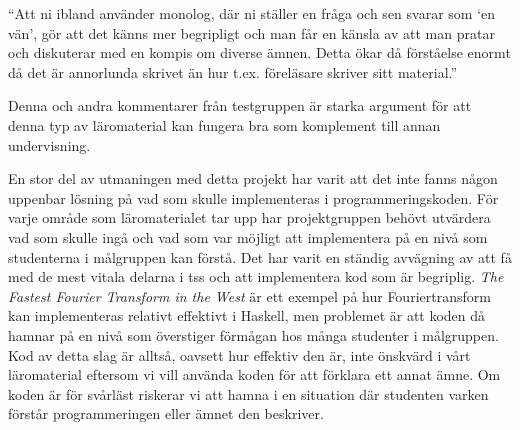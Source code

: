 \documentclass[12pt,a4paper,twoside,openright]{article}
\begin{document}
\begin{displayquote}
  ``Att ni ibland använder monolog, där ni ställer en fråga och sen
  svarar som `en vän', gör att det känns mer begripligt och man får en
  känsla av att man pratar och diskuterar med en kompis om diverse
  ämnen. Detta ökar då förståelse enormt då det är annorlunda skrivet än
  hur t.ex. föreläsare skriver sitt material.''
\end{displayquote}

Denna och andra kommentarer från testgruppen är starka argument för
att denna typ av läromaterial kan fungera bra som komplement till
annan undervisning.



En stor del av utmaningen med detta projekt har varit att det inte
fanns någon uppenbar lösning på vad som skulle implementeras i
programmeringskoden. För varje område som läromaterialet tar upp har
projektgruppen behövt utvärdera vad som skulle ingå och vad som var
möjligt att implementera på en nivå som studenterna i målgruppen kan
förstå. Det har varit en ständig avvägning av att få med de mest
vitala delarna i \gls{tss} och att implementera kod som är
begriplig. \textit{The Fastest Fourier Transform in the West}
\cite{fastestfourier} är ett exempel på hur Fouriertransform kan
implementeras relativt effektivt i Haskell, men problemet är att koden
då hamnar på en nivå som överstiger förmågan hos många studenter i
målgruppen. Kod av detta slag är alltså, oavsett hur effektiv den är,
inte önskvärd i vårt läromaterial eftersom vi vill använda koden för
att förklara ett annat ämne. Om koden är för svårläst riskerar vi att
hamna i en situation där studenten varken förstår programmeringen
eller ämnet den beskriver.
\end{document}

